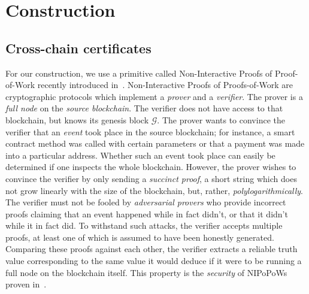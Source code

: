 \section{Construction}
\subsection*{Cross-chain certificates}
For our construction, we use a primitive called Non-Interactive Proofs of
Proof-of-Work recently introduced in~\cite{nipopows}.
Non-Interactive Proofs of Proofs-of-Work are cryptographic protocols which
implement a \emph{prover} and a \emph{verifier}. The prover is a \emph{full
node} on the \emph{source blockchain}. The verifier does not have access to
that blockchain, but knows its genesis block $\mathcal{G}$. The prover wants to
convince the verifier that an \emph{event} took place in the source blockchain;
for instance, a smart contract method was called with certain parameters or that
a payment was made into a particular address. Whether such an event took place
can easily be determined if one inspects the whole blockchain. However, the
prover wishes to convince the verifier by only sending a \emph{succinct proof},
a short string which does not grow linearly  with the size of the blockchain,
but, rather, \emph{polylogarithmically}. The verifier must not be fooled by
\emph{adversarial provers} who provide incorrect proofs claiming that an event
happened while    in fact didn't, or that it didn't while it in fact did. To
withstand such attacks, the verifier accepts multiple proofs, at least one of
which is assumed to have been honestly generated. Comparing these proofs against
each other, the verifier extracts a reliable truth value corresponding to the
same value it would deduce if it were to be running a full node on the
blockchain itself. This property is the \emph{security} of NIPoPoWs proven
in~\cite{nipopows}.

